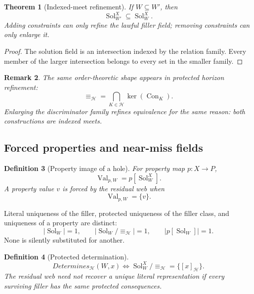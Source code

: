 \documentclass[11pt,oneside]{article}
\newtheorem{definition}{Definition}[section]
\newtheorem{theorem}[definition]{Theorem}
\newtheorem{remark}[definition]{Remark}
\newcommand{\Con}{\operatorname{Con}}
\begin{document}
\begin{theorem}[Indexed-meet refinement]
If \(W\subseteq W'\), then
\[
\boxed{
\operatorname{Sol}^{X}_{W'}
\subseteq
\operatorname{Sol}^{X}_{W}.
}
\]
Adding constraints can only refine the lawful filler field; removing constraints can only enlarge it.
\end{theorem}

\begin{proof}
The solution field is an intersection indexed by the relation family.  Every member of the larger intersection belongs to every set in the smaller family.
\end{proof}

\begin{remark}
The same order-theoretic shape appears in protected horizon refinement:
\[
\equiv_{\mathcal H}
=
\bigcap_{K\in\mathcal H}\ker(\Con_K).
\]
Enlarging the discriminator family refines equivalence for the same reason: both constructions are indexed meets.
\end{remark}

\subsection{Forced properties and near-miss fields}

\begin{definition}[Property image of a hole]
For property map \(p:X\to P\),
\[
\boxed{
\operatorname{Val}_{p,W}
=
p[\operatorname{Sol}^{X}_{W}].
}
\]
A property value \(v\) is forced by the residual web when
\[
\boxed{
\operatorname{Val}_{p,W}=\{v\}.
}
\]
\end{definition}

Literal uniqueness of the filler, protected uniqueness of the filler class, and uniqueness of a property are distinct:
\[
|\operatorname{Sol}_W|=1,
\qquad
|\operatorname{Sol}_W/{\equiv_{\mathcal H}}|=1,
\qquad
|p[\operatorname{Sol}_W]|=1.
\]
None is silently substituted for another.

\begin{definition}[Protected determination]
\[
\boxed{
Determines_{\mathcal H}(W,x)
\iff
\operatorname{Sol}^{X}_{W}/{\equiv_{\mathcal H}}
=
\{[x]_{\mathcal H}\}.
}
\]
The residual web need not recover a unique literal representation if every surviving filler has the same protected consequences.
\end{definition}
\end{document}
